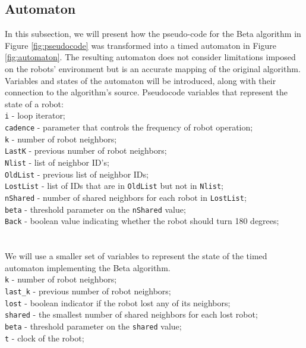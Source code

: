 \subsection{Automaton}
In this subsection, we will present how the pseudo-code for the Beta algorithm in Figure \ref{fig:pseudocode} was transformed into a timed automaton in Figure \ref{fig:automaton}. The resulting automaton does not consider limitations imposed on the robots' environment but is an accurate mapping of the original algorithm. Variables and states of the automaton will be introduced, along with their connection to the algorithm's source.
\newpage
\noindent
Pseudocode variables that represent the state of a robot:\\
\texttt{i} - loop iterator;\\
\texttt{cadence} - parameter that controls the frequency of robot operation;\\
\texttt{k} - number of robot neighbors;\\
\texttt{LastK} - previous number of robot neighbors;\\
\texttt{Nlist} - list of neighbor ID's;\\
\texttt{OldList} - previous list of neighbor IDs;\\
\texttt{LostList} - list of IDs that are in \texttt{OldList} but not in \texttt{Nlist};\\
\texttt{nShared} - number of shared neighbors for each robot in \texttt{LostList};\\
\texttt{beta} - threshold parameter on the \texttt{nShared} value;\\
\texttt{Back} - boolean value indicating whether the robot should turn 180 degrees;\\
\\\\
We will use a smaller set of variables to represent the state of the timed automaton implementing the Beta algorithm.\\
\texttt{k} - number of robot neighbors;\\
\texttt{last\_k} - previous number of robot neighbors;\\
\texttt{lost} - boolean indicator if the robot lost any of its neighbors;\\
\texttt{shared} - the smallest number of shared neighbors for each lost robot;\\
\texttt{beta} - threshold parameter on the \texttt{shared} value;\\
\texttt{t} - clock of the robot;\\
